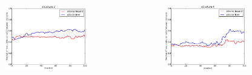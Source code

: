 \documentclass[english]{beamer}
\begin{document}
\begin{frame}
\begin{columns}[t]
        \vspace{-4ex}
        \begin{figure}
            \includegraphics[width=0.85\textwidth]{figures/Complex_hydrophobic_core/favourable_cont_structure2.pdf}  
        \end{figure}      
        \vspace{-5ex}
        \begin{figure}
            \includegraphics[width=0.85\textwidth]{figures/Complex_hydrophobic_core/favourable_cont_structure4.pdf}  
        \end{figure}       

    \end{columns}   
    
\end{frame}       

\end{document}
